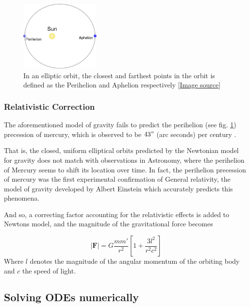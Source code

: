 \documentclass[10pt,showpacs,preprintnumbers,amsmath,amssymb,nofootinbib,aps,prl,twocolumn,groupedaddress,superscriptaddress,showkeys]{revtex4-1}
\begin{document}
      \begin{figure}[h!]
        \center
        \includegraphics[width=4cm]{figs/486px-Perihelion-Aphelion.png}
        \caption{In an elliptic orbit, the closest and farthest points in the orbit is defined as the Perihelion and Aphelion respectively [\href{https://en.wikipedia.org/wiki/Perihelion_and_aphelion}{Image source}]}
        \label{fig:perhelion}
      \end{figure}

    
    \subsubsection{Relativistic Correction}

      The aforementioned model of gravity fails to predict the perihelion (see fig. \ref{fig:perhelion}) precession of mercury, which is observed to be $43"$ (arc seconds) per century \cite{problem_set}. 

      That is, the closed, uniform elliptical orbits predicted by the Newtonian model for gravity does not match with observations in Astronomy, where the perihelion of Mercury seems to shift its location over time. In fact, the perihelion precession of mercury was the first experimental confirmation of General relativity, the model of gravity developed by Albert Einstein which accurately predicts this phenomena.

      And so, a correcting factor accounting for the relativistic effects is added to Newtons model, and the magnitude of the gravitational force becomes \cite{problem_set}

      \begin{equation}
        |\mathbf F| = G \frac{m m'}{r^2}\left[1 + \frac{3l^2}{r^2c^2}\right]
        \label{eqn:relativistic correction}
      \end{equation}
      Where $l$ denotes the magnitude of the angular momentum of the orbiting body and $c$ the speed of light.
\subsection{Solving ODEs numerically}
\end{document}
